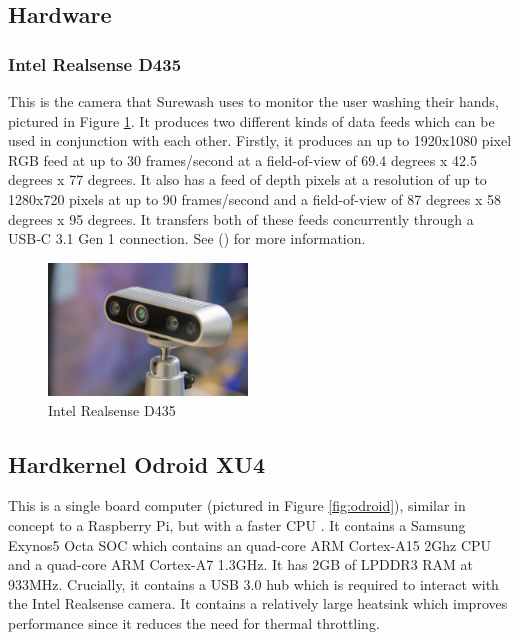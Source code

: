     \subsection{Hardware}
        \subsubsection{Intel Realsense D435}
        This is the camera that Surewash uses to monitor the user washing their hands, pictured in Figure \ref{fig:rs_cam}. It produces two different kinds of data feeds which can be used in conjunction with each other. Firstly, it produces an up to 1920x1080 pixel RGB feed at up to 30 frames/second at a field-of-view of 69.4 degrees x 42.5 degrees x 77 degrees. It also has a feed of depth pixels at a resolution of up to 1280x720 pixels at up to 90 frames/second and a field-of-view of 87 degrees x 58 degrees x 95 degrees. It transfers both of these feeds concurrently through a USB‑C 3.1 Gen 1 connection. See (\cite{d435}) for more information.
        \begin{figure}[h]
            \centering
            \includegraphics[height=100pt]{../img/rs_cam_2.jpg}
            \caption[]{Intel Realsense D435\footnotemark}
            \label{fig:rs_cam}
        \end{figure}

        \subsection{Hardkernel Odroid XU4}
        This is a single board computer (pictured in Figure \ref{fig:odroid}), similar in concept to a Raspberry Pi, but with a faster CPU \cite{odroid_xu4}. It contains a Samsung Exynos5 Octa SOC which contains an quad-core ARM Cortex-A15 2Ghz CPU and a quad-core ARM Cortex-A7 1.3GHz. It has 2GB of LPDDR3 RAM at 933MHz. Crucially, it contains a USB 3.0 hub which is required to interact with the Intel Realsense camera. It contains a relatively large heatsink which improves performance since it reduces the need for thermal throttling.

